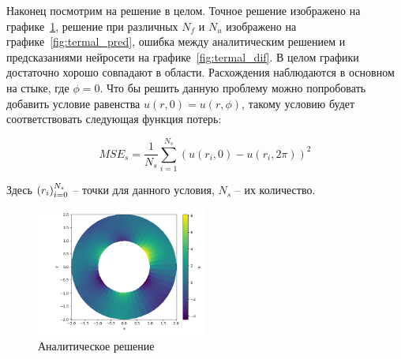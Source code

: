 \documentclass[a4paper,14pt]{extarticle} %
\begin{document}

% 

Наконец посмотрим на решение в целом. Точное решение изображено на графике~\ref{fig:termal_analit}, решение при различных $N_f$ и $N_u$ изображено на графике~\ref{fig:termal_pred}, ошибка между аналитическим решением и предсказаниями нейросети на графике~\ref{fig:termal_dif}. В целом графики достаточно хорошо совпадают в области. Расхождения наблюдаются в основном на стыке, где $\phi=0$. Что бы решить данную проблему можно попробовать добавить условие равенства $u(r, 0) = u(r, \phi)$, такому условию будет соответствовать следующая функция потерь:

\begin{equation}
    MSE_s = \frac{1}{N_s}\sum_{i=1}^{N_s} (u(r_i, 0) - u(r_i, 2\pi))^2
\end{equation}

Здесь ${\left( r_i \right)}_{i=0}^{N_s}$ -- точки для данного условия, $N_s$ -- их количество.

\begin{figure}[ht]
    \center
    \includegraphics[width=0.5\textwidth]{../plots/termal/solut analit.png}
    \caption{Аналитическое решение}
    \label{fig:termal_analit}
\end{figure}
\end{document}

